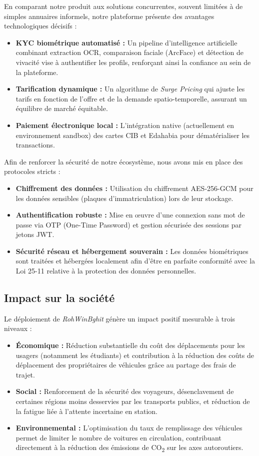 En comparant notre produit aux solutions concurrentes, souvent limitées à de simples annuaires informels, notre plateforme présente des avantages technologiques décisifs :
\begin{itemize}
    \item \textbf{KYC biométrique automatisé :} Un pipeline d'intelligence artificielle combinant extraction OCR, comparaison faciale (ArcFace) et détection de vivacité vise à authentifier les profils, renforçant ainsi la confiance au sein de la plateforme.
    \item \textbf{Tarification dynamique :} Un algorithme de \textit{Surge Pricing} qui ajuste les tarifs en fonction de l'offre et de la demande spatio-temporelle, assurant un équilibre de marché équitable.
    \item \textbf{Paiement électronique local :} L'intégration native (actuellement en environnement sandbox) des cartes CIB et Edahabia pour dématérialiser les transactions.
\end{itemize}

Afin de renforcer la sécurité de notre écosystème, nous avons mis en place des protocoles stricts :
\begin{itemize}
    \item \textbf{Chiffrement des données :} Utilisation du chiffrement AES-256-GCM pour les données sensibles (plaques d'immatriculation) lors de leur stockage.
    \item \textbf{Authentification robuste :} Mise en œuvre d'une connexion sans mot de passe via OTP (One-Time Password) et gestion sécurisée des sessions par jetons JWT.
    \item \textbf{Sécurité réseau et hébergement souverain :} Les données biométriques sont traitées et hébergées localement afin d'être en parfaite conformité avec la Loi 25-11 relative à la protection des données personnelles.
\end{itemize}

\subsection{Impact sur la société}

Le déploiement de \textit{RohWinBghit} génère un impact positif mesurable à trois niveaux :
\begin{itemize}
    \item \textbf{Économique :} Réduction substantielle du coût des déplacements pour les usagers (notamment les étudiants) et contribution à la réduction des coûts de déplacement des propriétaires de véhicules grâce au partage des frais de trajet.
    \item \textbf{Social :} Renforcement de la sécurité des voyageurs, désenclavement de certaines régions moins desservies par les transports publics, et réduction de la fatigue liée à l'attente incertaine en station.
    \item \textbf{Environnemental :} L'optimisation du taux de remplissage des véhicules permet de limiter le nombre de voitures en circulation, contribuant directement à la réduction des émissions de CO\textsubscript{2} sur les axes autoroutiers.
\end{itemize}

